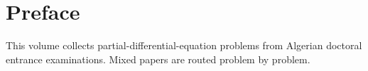 \documentclass[print]{docmathdz}
\begin{document}
\chapter*{Preface}
This volume collects partial-differential-equation problems from Algerian doctoral entrance examinations. Mixed papers are routed problem by problem.
\mainmatter


\backmatter\printbibliography[heading=bibintoc,title={References}]\printindex
\end{document}
